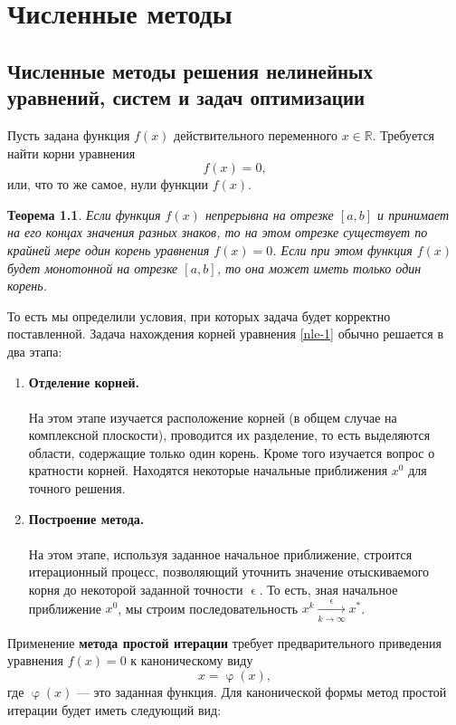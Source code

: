 \documentclass[a4paper, 12pt]{report}
\numberwithin{equation}{section}
\renewcommand{\varphi}{\upvarphi}
\renewcommand{\varepsilon}{\upvarepsilon}
\newtheorem*{theorem}{Теорема}
\begin{document}
	\chapter{Численные методы}
	\section{Численные методы решения нелинейных уравнений, систем и задач оптимизации}
	Пусть задана функция $f(x)$ действительного переменного $x \in \mathbb R$. Требуется найти корни уравнения 
	\begin{equation}
		\label{nle-1}
		f(x) = 0,
	\end{equation}
	или, что то же самое, нули функции $f(x)$. 
	\begin{theorem}
		Если функция $f(x)$ непрерывна на отрезке $[a,b]$ и принимает на его концах значения разных знаков, то на этом отрезке существует по крайней мере один корень уравнения $f(x) = 0$.
		Если при этом функция $f(x)$ будет монотонной на отрезке $[a,b]$, то она может иметь только один корень.
	\end{theorem}
	\noindent
	То есть мы определили условия, при которых задача будет корректно поставленной.
	Задача нахождения корней уравнения \eqref{nle-1} обычно решается в два этапа:
	\begin{enumerate}
		\item \textbf{Отделение корней.}\\\\
		На этом этапе изучается расположение корней (в общем случае на комплексной плоскости), проводится их разделение, то есть выделяются области, содержащие только один корень. Кроме того изучается вопрос о кратности корней. Находятся некоторые начальные приближения $x^0$ для точного решения.
		
		\item \textbf{Построение метода.}
		\\\\
		На этом этапе, используя заданное начальное приближение, строится итерационный процесс, позволяющий уточнить значение отыскиваемого корня до некоторой заданной точности $\varepsilon$. То есть, зная начальное приближение $x^0$, мы строим последовательность $x^k \xrightarrow[k\to\infty]{\varepsilon}x^*$.
	\end{enumerate}
	Применение \textbf{метода простой итерации} требует предварительного приведения уравнения $f(x) = 0$ к каноническому виду 
	\begin{equation}
		\label{mpi-1}
		x = \varphi(x),
	\end{equation} где $\varphi(x)$ --- это заданная функция. Для канонической формы метод простой итерации будет иметь следующий вид: 
\end{document}
